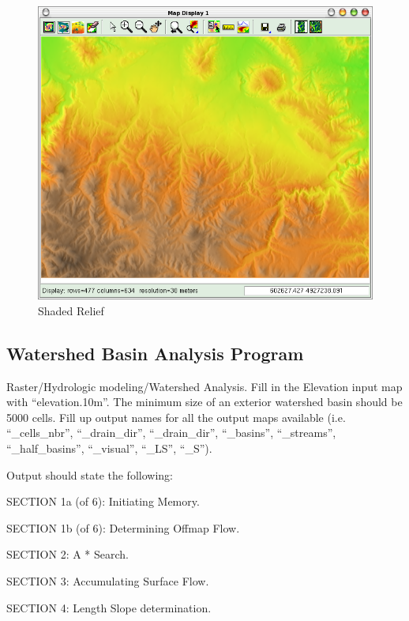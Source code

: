 \begin{figure}[htbp]
   \centering
   \includegraphics[scale=0.35]{grass011.png}
   \caption{Shaded Relief}
   \label{fig:grass011}
\end{figure}

\subsection{Watershed Basin Analysis Program}
Raster/Hydrologic modeling/Watershed Analysis.
Fill in the Elevation input map with ``elevation.10m''. The minimum size of an exterior watershed basin should be 5000 cells. Fill up output names for all the output maps available (i.e. ``\_cells\_nbr'', ``\_drain\_dir'', ``\_drain\_dir'', ``\_basins'', ``\_streams'', ``\_half\_basins'', ``\_visual'', ``\_LS'', ``\_S'').

Output should state the following:

SECTION 1a (of 6): Initiating Memory.

SECTION 1b (of 6): Determining Offmap Flow.

SECTION 2: A * Search. 

SECTION 3: Accumulating Surface Flow.

SECTION 4: Length Slope determination.

